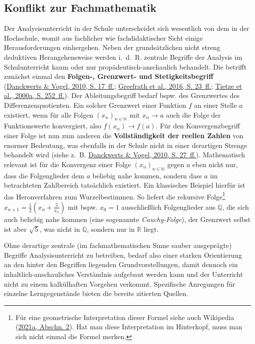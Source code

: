 \documentclass[
]{scrbook}
\theoremstyle{definition}
\theoremstyle{definition}
\theoremstyle{definition}
\theoremstyle{definition}
\theoremstyle{remark}
\begin{document}
\hypertarget{konflikt-zur-fachmathematik}{%
\subsection{Konflikt zur Fachmathematik}\label{konflikt-zur-fachmathematik}}

Der Analysisunterricht in der Schule unterscheidet sich wesentlich von dem in der Hochschule, womit aus fachlicher wie fachdidaktischer Sicht einige Herausforderungen einhergehen. Neben der grundsätzlichen nicht streng deduktiven Herangehensweise werden i.~d.~R. zentrale Begriffe der Analysis im Schulunterricht kaum oder nur propädeutisch-anschaulich behandelt. Die betrifft zunächst einmal den \textbf{Folgen-, Grenzwert- und Stetigkeitsbegriff} (\protect\hyperlink{ref-Danckwerts2010}{Danckwerts \& Vogel, 2010, S. 17~ff.}; \protect\hyperlink{ref-Greefrath2016}{Greefrath et al., 2016, S. 23~ff.}; \protect\hyperlink{ref-Tietze:2000a}{Tietze et al., 2000a, S. 252~ff.}). Der Ableitungsbegriff bedarf bspw. des Grenzwertes des Differenzenquotienten. Ein solcher Grenzwert einer Funktion \(f\) an einer Stelle \(a\) existiert, wenn für alle Folgen \((x_n)_{n\in\mathbb{N}}\) mit \(x_n\rightarrow a\) auch die Folge der Funktionswerte konvergiert, also \(f(x_n)\rightarrow f(a)\). Für den Konvergenzbegriff einer Folge ist nun zum anderen die \textbf{Vollständigkeit der reellen Zahlen} von enormer Bedeutung, was ebenfalls in der Schule nicht in einer derartigen Strenge behandelt wird (siehe z.~B. \protect\hyperlink{ref-Danckwerts2010}{Danckwerts \& Vogel, 2010, S. 27~ff.}). Mathematisch relevant ist für die Konvergenz einer Folge \((x_n)_{n\in\mathbb{N}}\) gegen \(a\) eben nicht nur, dass die Folgenglieder dem \(a\) beliebig nahe kommen, sondern dass \(a\) im betrachteten Zahlbereich tatsächlich existiert. Ein klassisches Beispiel hierfür ist das Heronverfahren zum Wurzelbestimmen. So liefert die rekursive Folge\footnote{Für eine geometrische Interpretation dieser Formel siehe auch Wikipedia (\protect\hyperlink{ref-dewiki:216870314}{2021a, Abschn. 2}). Hat man diese Interpretation im Hinterkopf, muss man sich nicht einmal die Formel merken.} \(x_{n+1} = \frac{1}{2}\left(x_n + \frac{5}{x_n}\right)\) mit bspw. \(x_0 = 1\) ausschließlich Folgenglieder aus \(\mathbb{Q}\), die sich auch beliebig nahe kommen (eine sogenannte \emph{Cauchy-Folge}), der Grenzwert selbst ist aber \(\sqrt{5}\), was nicht in \(\mathbb{Q}\), sondern nur in \(\mathbb{R}\) liegt.

Ohne derartige zentrale (im fachmathematischen Sinne sauber ausgeprägte) Begriffe Analysisunterricht zu betreiben, bedarf also einer starken Orientierung an den hinter den Begriffen liegenden Grundvorstellungen, damit dennoch ein inhaltlich-anschauliches Verständnis aufgebaut werden kann und der Unterricht nicht zu einem kalkülhaften Vorgehen verkommt. Spezifische Anregungen für einzelne Lerngegenstände bieten die bereits zitierten Quellen.
\end{document}
